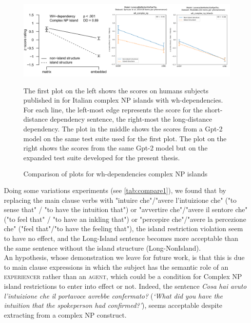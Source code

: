 \begin{figure}
	\centering
	\includegraphics[width=1\textwidth]{images/Chapter1/combined_wh-complex.png} 
	\caption{Comparison of plots for wh-dependencies complex NP islands} 
	\label{fig:wh_complex} %
	\medskip
	\small
	The first plot on the left shows the scores on humans subjects published in \citet{sprouse2016experimental} for Italian complex NP islands with wh-dependencies. For each line, the left-most edge represents the score for the short-distance dependency sentence, the right-most the long-distance dependency. The plot in the middle shows the scores from a Gpt-2 model \citep{de2020geppetto} on the same test suite used for the first plot. The plot on the right shows the scores from the same Gpt-2 model but on the expanded test suite developed for the present thesis.
\end{figure}

Doing some variations experiments (see  \autoref{tab:compare1}), we found that by replacing the main clause verbs with "intuire che"/"avere l'intuizione che" ("to sense that" / "to have the intuition that") or "avvertire che"/"avere il sentore che" ("to feel that" / "to have an inkling that") or "percepire che"/"avere la percezione che" ("feel that"/"to have the feeling that"), the island restriction violation seem to have no effect, and the Long-Island sentence becomes more acceptable than the same sentence without the island structure (Long-NonIsland). \\ 
An hypothesis, whose demonstration we leave for future work, is that this is due to main clause expressions in which the subject has the semantic role of an \textsc{experiencer} rather than an \textsc{agent}, which could be a condition for Complex NP island restrictions to enter into effect or not. Indeed, the sentence \textit{Cosa hai avuto l'intuizione che il portavoce avrebbe confermato?} (\textit{`What did you have the intuition that the spokeperson had confirmed?'}), seems acceptable despite extracting from a complex NP construct.

